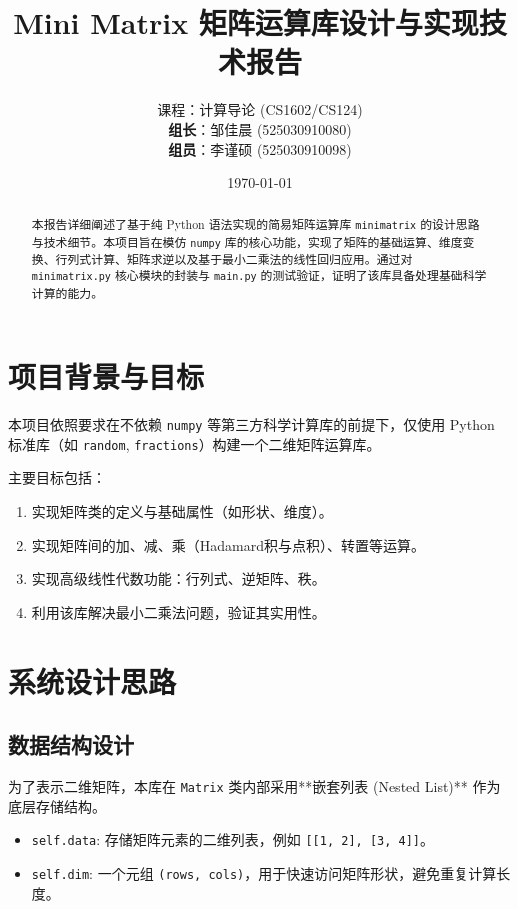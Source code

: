 \documentclass[a4paper,12pt]{ctexart}
\title{\textbf{Mini Matrix 矩阵运算库设计与实现技术报告}}
\author{
    课程：计算导论 (CS1602/CS124) \\[1em]
    \textbf{组长}：邹佳晨 (525030910080) \\
    \textbf{组员}：李谨硕 (525030910098)
}
\date{\today}
\begin{document}
\maketitle

\begin{abstract}
本报告详细阐述了基于纯 Python 语法实现的简易矩阵运算库 \texttt{minimatrix} 的设计思路与技术细节。本项目旨在模仿 \texttt{numpy} 库的核心功能，实现了矩阵的基础运算、维度变换、行列式计算、矩阵求逆以及基于最小二乘法的线性回归应用。通过对 \texttt{minimatrix.py} 核心模块的封装与 \texttt{main.py} 的测试验证，证明了该库具备处理基础科学计算的能力。
\end{abstract}

\newpage

\section{项目背景与目标}
本项目依照要求在不依赖 \texttt{numpy} 等第三方科学计算库的前提下，仅使用 Python 标准库（如 \texttt{random}, \texttt{fractions}）构建一个二维矩阵运算库。

主要目标包括：
\begin{enumerate}
    \item 实现矩阵类的定义与基础属性（如形状、维度）。
    \item 实现矩阵间的加、减、乘（Hadamard积与点积）、转置等运算。
    \item 实现高级线性代数功能：行列式、逆矩阵、秩。
    \item 利用该库解决最小二乘法问题，验证其实用性。
\end{enumerate}

\section{系统设计思路}

\subsection{数据结构设计}
为了表示二维矩阵，本库在 \texttt{Matrix} 类内部采用**嵌套列表 (Nested List)** 作为底层存储结构。
\begin{itemize}
    \item \texttt{self.data}: 存储矩阵元素的二维列表，例如 \texttt{[[1, 2], [3, 4]]}。
    \item \texttt{self.dim}: 一个元组 \texttt{(rows, cols)}，用于快速访问矩阵形状，避免重复计算长度。
\end{itemize}
\end{document}

